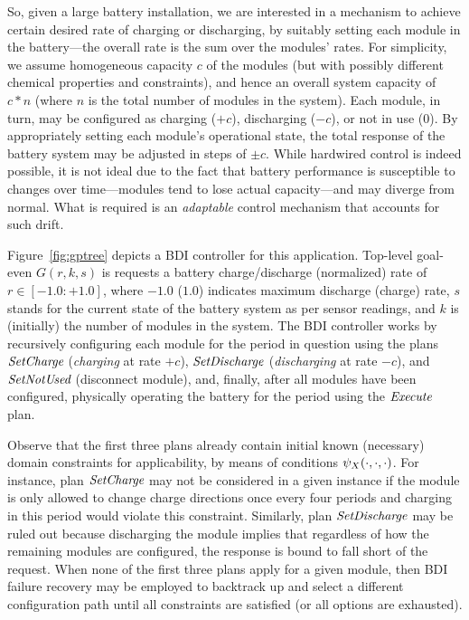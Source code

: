 So, given a large battery installation, we are interested in a mechanism to achieve certain desired rate of charging or discharging, by suitably setting each module in the battery---the overall rate is the sum over the modules' rates.  
For simplicity, we assume homogeneous capacity $c$ of the modules (but with possibly different chemical properties and constraints), and hence an overall system capacity of $c*n$ (where $n$ is the total number of modules in the system). Each module, in turn, may be configured as charging ($+c$), discharging ($-c$), or not in use ($0$). By appropriately setting each module's operational state, the total response of the battery system may be adjusted in steps of $\pm c$.
While hardwired control is indeed possible, it is not ideal due to the fact that battery performance is susceptible to changes over time---modules tend to lose actual capacity---and may diverge from normal. 
What is required is an \emph{adaptable} control mechanism that accounts for such drift. 

Figure~\ref{fig:gptree} depicts a BDI controller for this application. Top-level goal-even $G(r,k,s)$ is requests a battery charge/discharge (normalized) rate of $r \in [-1.0:+1.0]$, where $-1.0$ ($1.0$) indicates maximum discharge (charge) rate, $s$ stands for the current state of the battery system as per sensor readings, and $k$ is (initially) the number of modules in the system. 
The BDI controller works by recursively configuring each module for the period in question using the plans $\operatorname{\textit{SetCharge}}$ (\emph{charging} at rate $+c$), $\operatorname{\textit{SetDischarge}}$ (\emph{discharging} at rate $-c$), and $\operatorname{\textit{SetNotUsed}}$ (disconnect module), and, finally, after all modules have been configured, physically operating the battery for the period using the $\operatorname{\textit{Execute}}$ plan. 

Observe that the first three plans already contain initial known (necessary) domain constraints for applicability, by means of conditions $\psi_X(\cdot,\cdot,\cdot)$. For instance, plan $\operatorname{\textit{SetCharge}}$ may not be considered in a given instance if the module is only allowed to change charge directions once every four periods and charging in this period would violate this constraint. 
Similarly, plan $\operatorname{\textit{SetDischarge}}$ may be ruled out because discharging the module implies that regardless of how the remaining modules are configured, the response is bound to fall short of the request.
When none of the first three plans apply for a given module, then BDI failure recovery may be employed to backtrack up and select a different configuration path until all constraints are satisfied (or all options are exhausted). 

